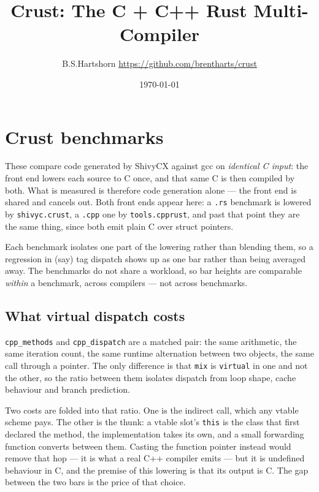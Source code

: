 \documentclass[11pt]{article}
\title{Crust: The C + C++ Rust Multi-Compiler}
\author{B.S.Hartshorn \orcidlink{0009-0004-2853-655X} \small\url{https://github.com/brentharts/crust}}
\date{\today}
\begin{document}
\maketitle
\tableofcontents
\newpage



\section{Crust benchmarks}

These compare code generated by ShivyCX against gcc on \emph{identical C
input}: the front end lowers each source to C once, and that same C is then
compiled by both. What is measured is therefore code generation alone --- the
front end is shared and cancels out. Both front ends appear here: a
\texttt{.rs} benchmark is lowered by \texttt{shivyc.crust}, a \texttt{.cpp}
one by \texttt{tools.cpprust}, and past that point they are the same thing,
since both emit plain C over struct pointers.

Each benchmark isolates one part of the lowering rather than blending them, so
a regression in (say) tag dispatch shows up as one bar rather than being
averaged away. The benchmarks do not share a workload, so bar heights are
comparable \emph{within} a benchmark, across compilers --- not across
benchmarks.

\subsection*{What virtual dispatch costs}

\texttt{cpp\_methods} and \texttt{cpp\_dispatch} are a matched pair: the same
arithmetic, the same iteration count, the same runtime alternation between two
objects, the same call through a pointer. The only difference is that
\texttt{mix} is \texttt{virtual} in one and not the other, so the ratio
between them isolates dispatch from loop shape, cache behaviour and branch
prediction.

Two costs are folded into that ratio. One is the indirect call, which any
vtable scheme pays. The other is the thunk: a vtable slot's \texttt{this} is
the class that first declared the method, the implementation takes its own,
and a small forwarding function converts between them. Casting the function
pointer instead would remove that hop --- it is what a real C++ compiler
emits --- but it is undefined behaviour in C, and the premise of this lowering
is that its output is C. The gap between the two bars is the price of that
choice.
\end{document}
